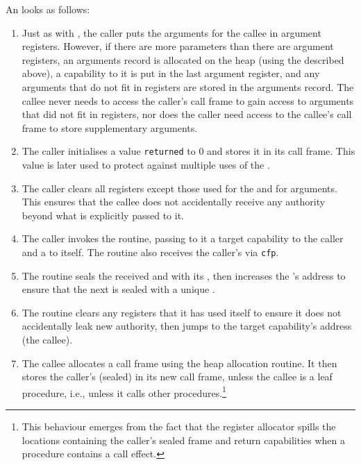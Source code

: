 \documentclass[main.tex]{subfiles}
\begin{document}
An  looks as follows:
\begin{enumerate}
	
	\item Just as with , the caller puts the arguments for the callee in argument registers. However, if there are more parameters than there are argument registers, an arguments record is allocated on the heap (using the  described above), a capability to it is put in the last argument register, and any arguments that do not fit in registers are stored in the arguments record. The callee never needs to access the caller's call frame to gain access to arguments that did not fit in registers, nor does the caller need access to the callee's call frame to store supplementary arguments.
	
	\item \label{itm:returned-init} The caller initialises a value \texttt{returned} to 0 and stores it in its call frame. This value is later used to protect against multiple uses of the .
	
	\item The caller clears all registers except those used for the  and for arguments. This ensures that the callee does not accidentally receive any authority beyond what is explicitly passed to it.
	
	\item The caller invokes the  routine, passing to it a target capability to the caller and a  to itself. The routine also receives the caller's  via \texttt{cfp}.
	
	\item The routine seals the received  and  with its , then increases the 's address to ensure that the next  is sealed with a unique .
	
	\item The routine clears any registers that it has used itself to ensure it does not accidentally leak new authority, then jumps to the target capability's address (the callee).
	
	\item The callee allocates a call frame using the heap allocation routine. It then stores the caller's (sealed)  in its new call frame, unless the callee is a leaf procedure, i.e., unless it calls other procedures.\footnote{This behaviour emerges from the fact that the register allocator spills the locations containing the caller's sealed frame and return capabilities when a procedure contains a call effect.}
	

\end{enumerate}
\end{document}
